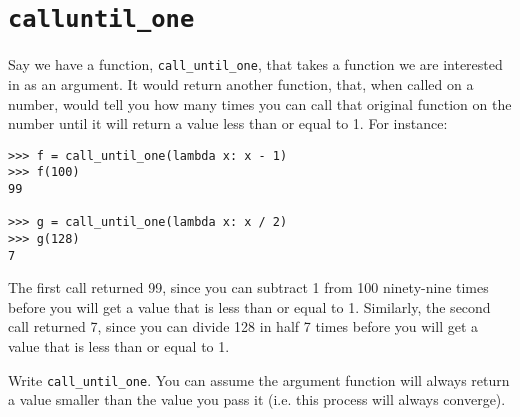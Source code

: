 \documentclass[10pt]{article}
\begin{document}
\section*{\texttt{call\textunderscore until\_one}}
Say we have a function, \texttt{call\_until\_one}, that takes a function we are
interested in as an argument. It would return another function, that, when
called on a number, would tell you how many times you can call that original
function on the number until it will return a value less than or equal to 1. For
instance:

\begin{verbatim}
>>> f = call_until_one(lambda x: x - 1)
>>> f(100)
99

>>> g = call_until_one(lambda x: x / 2)
>>> g(128)
7
\end{verbatim}

The first call returned 99, since you can subtract 1 from 100 ninety-nine times
before you will get a value that is less than or equal to 1. Similarly, the
second call returned 7, since you can divide 128 in half 7 times before you will
get a value that is less than or equal to 1.

Write \texttt{call\_until\_one}. You can assume the argument function will
always return a value smaller than the value you pass it (i.e. this process will
always converge).
\end{document}
